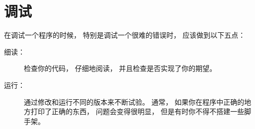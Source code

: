 {%
\section{调试}

在调试一个程序的时候， 特别是调试一个很难的错误时， 应该做到以下五点：


\begin{description}

\item [细读：]检查你的代码， 仔细地阅读， 并且检查是否实现了你的期望。

\item [运行：]通过修改和运行不同的版本来不断试验。    通常， 如果你在程序中正确的地方打印了正确的东西， 问题会变得很明显， 但是有时你不得不搭建一些脚手架。


\end{description}}
